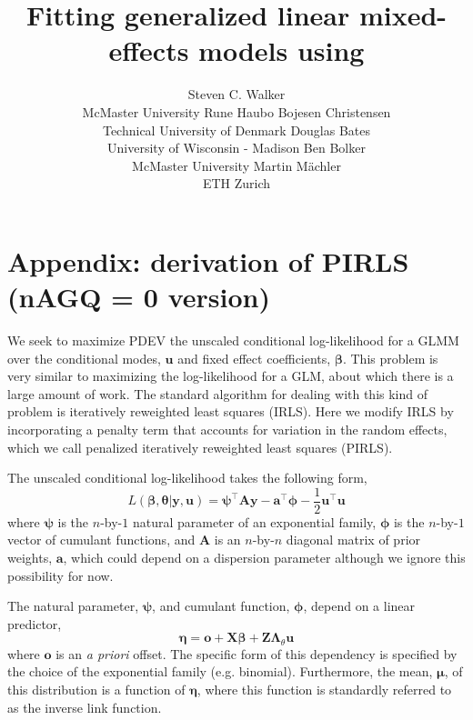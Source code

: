 \documentclass{jss}
\author{
  Steven C. Walker\\McMaster University \And
  Rune Haubo Bojesen Christensen\\Technical University of Denmark\AND
  Douglas Bates\\University of Wisconsin - Madison \And
  Ben Bolker\\McMaster University \AND
  Martin M\"achler\\ETH Zurich
}
\title{Fitting generalized linear \bmb{and nonlinear?} mixed-effects models using \pkg{lme4}}
\begin{document}

\section{Appendix: derivation of PIRLS (nAGQ = 0 version)}

We seek to maximize PDEV the unscaled conditional log-likelihood 
for a GLMM over the conditional modes, $\bm u$ and fixed effect
coefficients, $\bm\beta$. This problem is very similar to maximizing
the log-likelihood for a GLM, about which there is a large amount of
work. The standard algorithm for dealing with this kind of problem is
iteratively reweighted least squares (IRLS). Here we modify IRLS by
incorporating a penalty term that accounts for variation in the random
effects, which we call penalized iteratively reweighted least squares (PIRLS). 

The unscaled conditional log-likelihood takes the following form,
\begin{equation}
L(\bm\beta, \bm\theta | \bm y, \bm u) = 
\bm\psi^\top \bm A \bm y - 
\bm a^\top \bm \phi -
\frac{1}{2}\bm u^\top \bm u
\end{equation}
where $\bm\psi$ is the $n$-by-$1$ natural parameter of an exponential family,
$\bm\phi$ is the $n$-by-$1$ vector of cumulant functions, and $\bm A$ is an $n$-by-$n$ diagonal
matrix of prior weights, $\bm a$, which could depend on a dispersion
parameter although we ignore this possibility for now.

The natural parameter, $\bm\psi$, and cumulant function, $\bm\phi$,
depend on a linear predictor,
\begin{equation}
\bm\eta = \bm o + \bm X \bm\beta + \bm Z \bm\Lambda_\theta \bm u
\end{equation}
where $\bm o$ is an \emph{a priori} offset. The specific form of this
dependency is specified by the choice of the exponential family
(e.g. binomial). Furthermore, the mean, $\bm\mu$, of this distribution
is a function of $\bm\eta$, where this function is standardly referred
to as the inverse link function.
\end{document}
